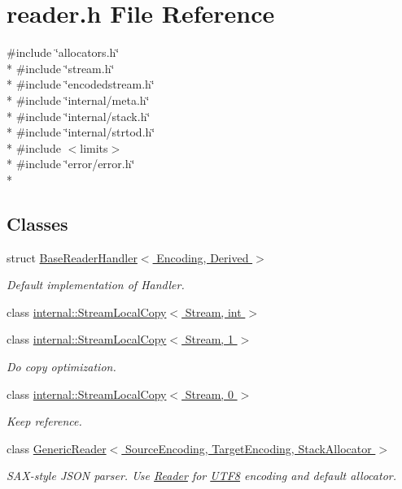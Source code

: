 \hypertarget{a00683}{}\section{reader.\+h File Reference}
\label{a00683}
{\ttfamily \#include \char`\"{}allocators.\+h\char`\"{}}\\*
{\ttfamily \#include \char`\"{}stream.\+h\char`\"{}}\\*
{\ttfamily \#include \char`\"{}encodedstream.\+h\char`\"{}}\\*
{\ttfamily \#include \char`\"{}internal/meta.\+h\char`\"{}}\\*
{\ttfamily \#include \char`\"{}internal/stack.\+h\char`\"{}}\\*
{\ttfamily \#include \char`\"{}internal/strtod.\+h\char`\"{}}\\*
{\ttfamily \#include $<$limits$>$}\\*
{\ttfamily \#include \char`\"{}error/error.\+h\char`\"{}}\\*
\subsection*{Classes}
\begin{DoxyCompactItemize}
\item 
struct \hyperlink{a00045}{Base\+Reader\+Handler$<$ Encoding, Derived $>$}
\begin{DoxyCompactList}\small\item\em Default implementation of Handler. \end{DoxyCompactList}\item 
class \hyperlink{a00285}{internal\+::\+Stream\+Local\+Copy$<$ Stream, int $>$}
\item 
class \hyperlink{a00287}{internal\+::\+Stream\+Local\+Copy$<$ Stream, 1 $>$}
\begin{DoxyCompactList}\small\item\em Do copy optimization. \end{DoxyCompactList}\item 
class \hyperlink{a00286}{internal\+::\+Stream\+Local\+Copy$<$ Stream, 0 $>$}
\begin{DoxyCompactList}\small\item\em Keep reference. \end{DoxyCompactList}\item 
class \hyperlink{a00122}{Generic\+Reader$<$ Source\+Encoding, Target\+Encoding, Stack\+Allocator $>$}
\begin{DoxyCompactList}\small\item\em S\+A\+X-\/style J\+S\+ON parser. Use \hyperlink{a00683_a84f3b66a66647f4ac4267078359188ba}{Reader} for \hyperlink{a00333}{U\+T\+F8} encoding and default allocator. \end{DoxyCompactList}\end{DoxyCompactItemize}
